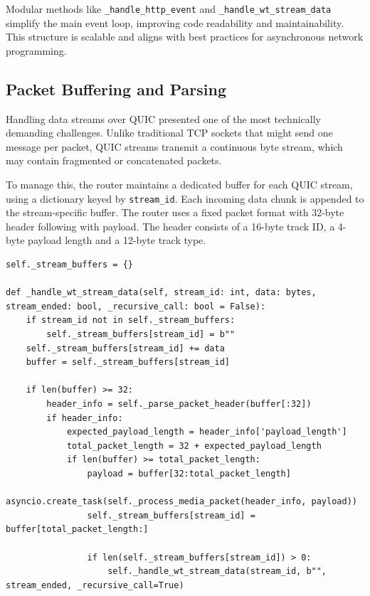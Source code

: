 Modular methods like \texttt{\_handle\_http\_event} and \texttt{\_handle\_wt\_stream\_data} simplify the main event loop, improving code readability and maintainability. This structure is scalable and aligns with best practices for asynchronous network programming.

\subsection{Packet Buffering and Parsing}

Handling data streams over QUIC presented one of the most technically demanding challenges. Unlike traditional TCP sockets that might send one message per packet, QUIC streams transmit a continuous byte stream, which may contain fragmented or concatenated packets.

To manage this, the router maintains a dedicated buffer for each QUIC stream, using a dictionary keyed by \texttt{stream\_id}. Each incoming data chunk is appended to the stream-specific buffer. The router uses a fixed packet format with 32-byte header following with payload. The header consists of a 16-byte track ID, a 4-byte payload length and a 12-byte track type.

\begin{lstlisting}[breaklines=true,basicstyle=\small\ttfamily,frame=single]
self._stream_buffers = {}

def _handle_wt_stream_data(self, stream_id: int, data: bytes, stream_ended: bool, _recursive_call: bool = False):
    if stream_id not in self._stream_buffers:
        self._stream_buffers[stream_id] = b""
    self._stream_buffers[stream_id] += data
    buffer = self._stream_buffers[stream_id]

    if len(buffer) >= 32:
        header_info = self._parse_packet_header(buffer[:32])
        if header_info:
            expected_payload_length = header_info['payload_length']
            total_packet_length = 32 + expected_payload_length
            if len(buffer) >= total_packet_length:
                payload = buffer[32:total_packet_length]
                asyncio.create_task(self._process_media_packet(header_info, payload))
                self._stream_buffers[stream_id] = buffer[total_packet_length:]

                if len(self._stream_buffers[stream_id]) > 0:
                    self._handle_wt_stream_data(stream_id, b"", stream_ended, _recursive_call=True)
\end{lstlisting}

